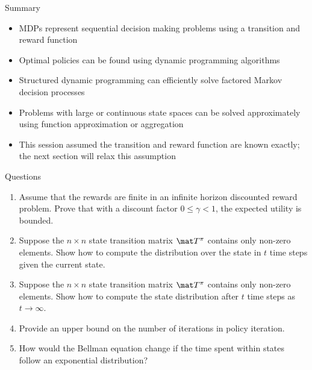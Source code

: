 \documentclass[handout]{dmu}
\begin{document}
\begin{frame}{Summary}
\begin{itemize}
\item<1-> MDPs represent sequential decision making problems using a transition and reward function
\item<2-> Optimal policies can be found using dynamic programming algorithms
\item<3-> Structured dynamic programming can efficiently solve factored Markov decision processes
\item<4-> Problems with large or continuous state spaces can be solved approximately using function approximation or aggregation
\item<5-> This session assumed the transition and reward function are known exactly; the next section will relax this assumption
\end{itemize}
\end{frame}

\begin{frame}{Questions}
\begin{enumerate}
\item Assume that the rewards are finite in an infinite horizon discounted reward problem. Prove that with a discount factor $0 \leq \gamma < 1$, the expected utility is bounded.
\item Suppose the $n \times n$ state transition matrix $\mat T^\pi$ contains only non-zero elements. Show how to compute the distribution over the state in $t$ time steps given the current state.
\item Suppose the $n \times n$ state transition matrix $\mat T^\pi$ contains only non-zero elements. Show how to compute the state distribution after $t$ time steps as $t \rightarrow \infty$.
\item Provide an upper bound on the number of iterations in policy iteration.
\item How would the Bellman equation change if the time spent within states follow an exponential distribution?
\seti
\end{enumerate}
\end{frame}
\end{document}
